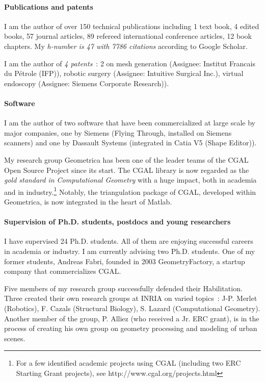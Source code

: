 \paragraph{Publications and patents} \mbox{}

I am the author of over 150 technical publications including 1 text book, 4 edited books, 57 journal articles, 89 refereed international conference articles, 12 book chapters. My {\em h-number is 47 with 7786 citations} according to Google Scholar. 

I am the author of {\em 4 patents}~: 2 on mesh generation (Assignee: Institut Francais du P\'etrole (IFP)), robotic surgery (Assignee: Intuitive Surgical Inc.), virtual endoscopy (Assignee: Siemens Corporate Research)).

\paragraph{Software} \mbox{}

I am the author of two software that have been commercialized at large scale by major companies, one by Siemens (Flying Through, installed on Siemens scanners) and one by Dassault Systems (integrated in Catia V5 (Shape Editor)). 

My research group Geometrica has been one of the leader teams of  the CGAL Open Source Project since its start.  The CGAL library  is now regarded as the {\em gold standard in Computational Geometry} with a huge impact, both in academia and in industry.\footnote{For a few identified academic projects using CGAL (including two ERC Starting Grant projects), see
http://www.cgal.org/projects.html} Notably, the triangulation package of CGAL, developed within Geometrica, is now integrated in the heart of Matlab.

\paragraph{Supervision of Ph.D. students, postdocs and young researchers} \mbox{}

I have supervised 24 Ph.D. students. All of them are enjoying successful careers in academia or industry. I am currently advising two Ph.D. students. One of my former students, Andreas Fabri, founded in 2003 GeometryFactory, a startup company that commercializes CGAL.

Five members of my research group successfully defended their Habilitation.  Three created their own research groups at INRIA on varied topics~: J-P. Merlet (Robotics), F. Cazals (Structural Biology), S. Lazard (Computational Geometry). Another member of the group, P. Alliez (who received a Jr. ERC grant), is in the process of creating his own group on geometry processing and modeling of urban scenes.

